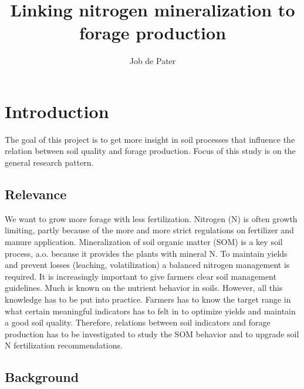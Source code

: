 \documentclass[10pt,twoside,dutch,english]{report}
\author{Job de Pater}
\title{Linking nitrogen mineralization to forage production} %
\begin{document}
\maketitle


\setcounter{tocdepth}{1}
\tableofcontents

\thispagestyle{empty}
\pagebreak
{}



\chapter{Introduction}
The goal of this project is to get more insight in soil processes that influence the relation between soil quality and forage production. Focus of this study is on the general research pattern. 

	\section{Relevance}
	We want to grow more forage with less fertilization. Nitrogen (N) is often growth limiting, partly because of the more and more strict regulations on fertilizer and manure application. Mineralization of soil organic matter (SOM) is a key soil process, a.o. because it provides the plants with mineral N. To maintain yields and prevent losses (leaching, volatilization) a balanced nitrogen management is required. It is increasingly important to give farmers clear soil management guidelines. Much is known on the nutrient behavior in soils. However, all this knowledge has to be put into practice. Farmers has to know the target range in what certain meaningful indicators has to felt in to optimize yields and maintain a good soil quality. Therefore, relations between soil indicators and forage production has to be investigated to study the SOM behavior and to upgrade soil N fertilization recommendations. 
	
	
		\section{Background} %
	
\end{document}
